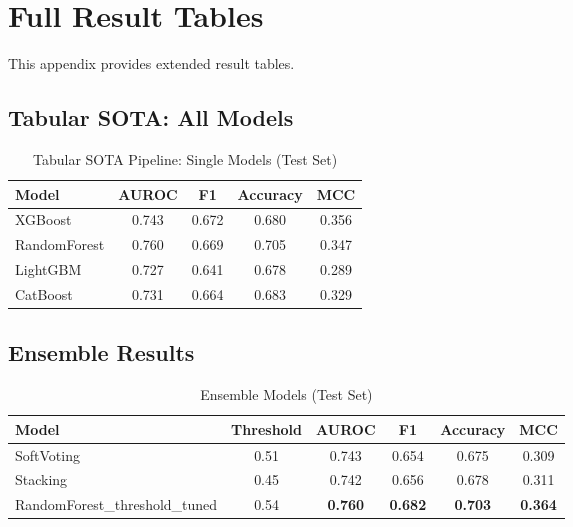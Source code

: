 \chapter{Full Result Tables}
\label{app:tables}

This appendix provides extended result tables.

\section{Tabular SOTA: All Models}

\begin{table}[h]
\centering
\caption{Tabular SOTA Pipeline: Single Models (Test Set)}
\begin{tabular}{lcccc}
\toprule
Model & AUROC & F1 & Accuracy & MCC \\
\midrule
XGBoost & 0.743 & 0.672 & 0.680 & 0.356 \\
RandomForest & 0.760 & 0.669 & 0.705 & 0.347 \\
LightGBM & 0.727 & 0.641 & 0.678 & 0.289 \\
CatBoost & 0.731 & 0.664 & 0.683 & 0.329 \\
\bottomrule
\end{tabular}
\end{table}

\section{Ensemble Results}

\begin{table}[h]
\centering
\caption{Ensemble Models (Test Set)}
\begin{tabular}{lccccc}
\toprule
Model & Threshold & AUROC & F1 & Accuracy & MCC \\
\midrule
SoftVoting & 0.51 & 0.743 & 0.654 & 0.675 & 0.309 \\
Stacking & 0.45 & 0.742 & 0.656 & 0.678 & 0.311 \\
RandomForest\_threshold\_tuned & 0.54 & \textbf{0.760} & \textbf{0.682} & \textbf{0.703} & \textbf{0.364} \\
\bottomrule
\end{tabular}
\end{table}

